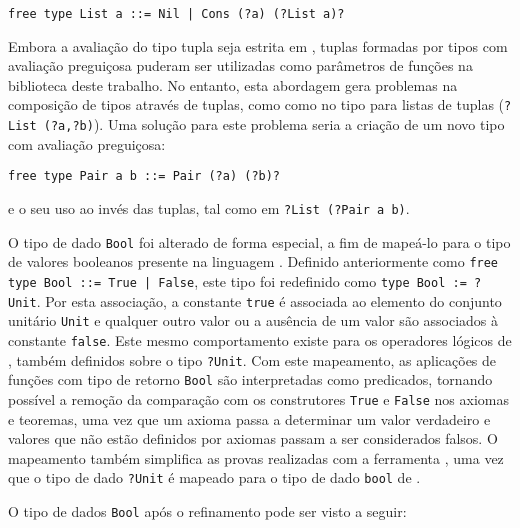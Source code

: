 \begin{minipage}[t]{0.9\linewidth}
\begin{Verbatim}
free type List a ::= Nil | Cons (?a) (?List a)?
\end{Verbatim}
\end{minipage}

Embora a avaliação do tipo tupla seja estrita em \HasCASL, tuplas formadas por tipos com avaliação preguiçosa puderam ser utilizadas como parâmetros de funções na biblioteca deste trabalho.
No entanto, esta abordagem gera problemas na composição de tipos através de tuplas, como como no tipo para listas de tuplas (\Verb.?List (?a,?b).).
Uma solução para este problema seria a criação de um novo tipo com avaliação preguiçosa:

\begin{minipage}[t]{0.9\linewidth}
\begin{Verbatim}
free type Pair a b ::= Pair (?a) (?b)?
\end{Verbatim}
\end{minipage}

e o seu uso ao invés das tuplas, tal como em \Verb.?List (?Pair a b)..

O tipo de dado \Verb.Bool. foi alterado de forma especial, a fim de mapeá-lo para o tipo de valores booleanos presente na linguagem \HasCASL.
Definido anteriormente como \Verb.free type Bool ::= True | False., este tipo foi redefinido como \Verb.type Bool := ?Unit..
Por esta associação, a constante \Verb.true. é associada ao elemento do conjunto unitário \Verb.Unit. e qualquer outro valor ou a ausência de um valor são associados à constante \Verb.false..
Este mesmo comportamento existe para os operadores lógicos de \HasCASL, também definidos sobre o tipo \Verb.?Unit..
Com este mapeamento, as aplicações de funções com tipo de retorno \Verb.Bool. são interpretadas como predicados, tornando possível a remoção da comparação com os construtores \Verb.True. e \Verb.False. nos axiomas e teoremas, uma vez que um axioma passa a determinar um valor verdadeiro e valores que não estão definidos por axiomas passam a ser considerados falsos.
O mapeamento também simplifica as provas realizadas com a ferramenta \Hets, uma vez que o tipo de dado \Verb.?Unit. é mapeado para o tipo de dado \Verb.bool. de \HOL.

\pagebreak

O tipo de dados \Verb.Bool. após o refinamento pode ser visto a seguir:


